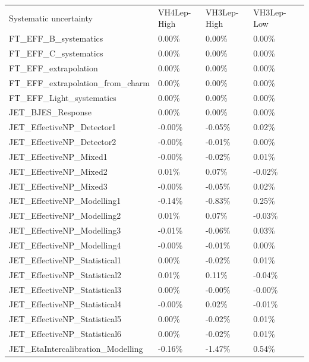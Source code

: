 \begin{center}
\begin{longtable}{|l|l|l|l|l|}
\hline
Systematic uncertainty   & VH4Lep-High   & VH3Lep-High  & VH3Lep-Low   \\
 FT\_EFF\_B\_systematics   & 0.00\%   & 0.00\%   & 0.00\%   \\
 FT\_EFF\_C\_systematics   & 0.00\%   & 0.00\%   & 0.00\%   \\
 FT\_EFF\_extrapolation   & 0.00\%   & 0.00\%   & 0.00\%   \\
 FT\_EFF\_extrapolation\_from\_charm   & 0.00\%   & 0.00\%   & 0.00\%   \\
 FT\_EFF\_Light\_systematics   & 0.00\%   & 0.00\%   & 0.00\%   \\
 JET\_BJES\_Response   & 0.00\%   & 0.00\%   & 0.00\%   \\
 JET\_EffectiveNP\_Detector1   & -0.00\%   & -0.05\%   & 0.02\%   \\
 JET\_EffectiveNP\_Detector2   & -0.00\%   & -0.01\%   & 0.00\%   \\
 JET\_EffectiveNP\_Mixed1   & -0.00\%   & -0.02\%   & 0.01\%   \\
 JET\_EffectiveNP\_Mixed2   & 0.01\%   & 0.07\%   & -0.02\%   \\
 JET\_EffectiveNP\_Mixed3   & -0.00\%   & -0.05\%   & 0.02\%   \\
 JET\_EffectiveNP\_Modelling1   & -0.14\%   & -0.83\%   & 0.25\%   \\
 JET\_EffectiveNP\_Modelling2   & 0.01\%   & 0.07\%   & -0.03\%   \\
 JET\_EffectiveNP\_Modelling3   & -0.01\%   & -0.06\%   & 0.03\%   \\
 JET\_EffectiveNP\_Modelling4   & -0.00\%   & -0.01\%   & 0.00\%   \\
 JET\_EffectiveNP\_Statistical1   & 0.00\%   & -0.02\%   & 0.01\%   \\
 JET\_EffectiveNP\_Statistical2   & 0.01\%   & 0.11\%   & -0.04\%   \\
 JET\_EffectiveNP\_Statistical3   & 0.00\%   & -0.00\%   & -0.00\%   \\
 JET\_EffectiveNP\_Statistical4   & -0.00\%   & 0.02\%   & -0.01\%   \\
 JET\_EffectiveNP\_Statistical5   & 0.00\%   & -0.02\%   & 0.01\%   \\
 JET\_EffectiveNP\_Statistical6   & 0.00\%   & -0.02\%   & 0.01\%   \\
 JET\_EtaIntercalibration\_Modelling   & -0.16\%   & -1.47\%   & 0.54\%   \\

\end{longtable}
\end{center}

